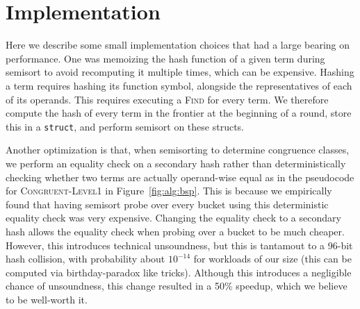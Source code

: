 \section{Implementation}
\label{sec:implementation}


Here we describe some small implementation choices that had a large bearing on
performance. One was memoizing the hash function of a given term during semisort
to avoid recomputing it multiple times, which can be expensive. Hashing a term
requires hashing its function symbol, alongside the representatives of each of
its operands. This requires executing a \textsc{Find} for every term. We
therefore compute the hash of every term in the frontier at the beginning of a
round, store this in a \texttt{struct}, and perform semisort on these structs. 


Another optimization is that, when semisorting to determine congruence classes,
we perform an equality check on a secondary hash rather than deterministically
checking whether two terms are actually operand-wise equal as in the pseudocode
for \textsc{Congruent-Level1} in Figure~\ref{fig:alg:bsp}. This is because we
empirically found that having semisort probe over every bucket using this
deterministic equality check was very expensive. Changing the equality check to
a secondary hash allows the equality check when probing over a bucket to be much
cheaper. However, this introduces technical unsoundness, but this is tantamout
to a 96-bit hash collision, with probability about $10^{-14}$ for workloads of
our size (this can be computed via birthday-paradox like tricks). Although this
introduces a negligible chance of unsoundness, this change resulted in a 50\%
speedup, which we believe to be well-worth it.
